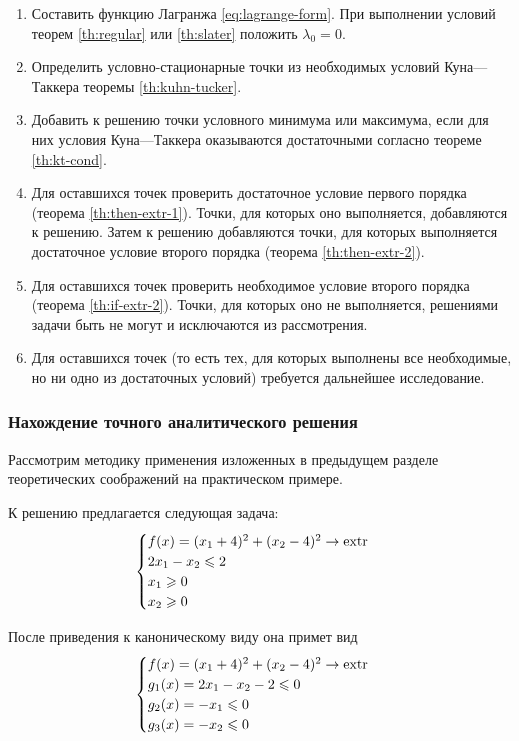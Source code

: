 \begin{enumerate}
  \renewcommand{\labelenumi}{\textbf{Шаг \arabic{enumi}.}}
\item Составить функцию Лагранжа \eqref{eq:lagrange-form}. При
  выполнении условий теорем \ref{th:regular} или \ref{th:slater}
  положить $\lambda_0 = 0$.
\item Определить условно-стационарные точки из необходимых условий
  Куна—Таккера теоремы \ref{th:kuhn-tucker}.
\item Добавить к решению точки условного минимума или максимума, если
  для них условия Куна—Таккера оказываются достаточными согласно
  теореме \ref{th:kt-cond}.
\item Для оставшихся точек проверить достаточное условие первого
  порядка (теорема \ref{th:then-extr-1}). Точки, для которых оно
  выполняется, добавляются к решению. Затем к решению добавляются
  точки, для которых выполняется достаточное условие второго порядка
  (теорема \ref{th:then-extr-2}).
\item Для оставшихся точек проверить необходимое условие второго
  порядка (теорема \ref{th:if-extr-2}). Точки, для которых оно не
  выполняется, решениями задачи быть не могут и исключаются из
  рассмотрения.
\item Для оставшихся точек (то есть тех, для которых выполнены все
  необходимые, но ни одно из достаточных условий) требуется дальнейшее
  исследование.
\end{enumerate}

\clearpage
\subsubsection{Нахождение точного аналитического решения}

Рассмотрим методику применения изложенных в предыдущем разделе
теоретических соображений на практическом примере.

К решению предлагается следующая задача:
\begin{equation}
  \label{eq:cond-optim-problem-raw}
  \begin{cases}
    f(x) = (x_1+4)^2 + (x_2-4)^2 \to \operatorname{extr} \\
    2x_1 - x_2 \leqslant 2 \\
    x_1 \geqslant 0 \\
    x_2 \geqslant 0
  \end{cases}
\end{equation}

После приведения к каноническому виду она примет вид
\begin{equation}
  \label{eq:cond-optim-problem}
  \begin{cases}
    f(x) = (x_1+4)^2 + (x_2-4)^2 \to \operatorname{extr} \\
    g_1(x) = 2x_1 - x_2 - 2 \leqslant 0 \\
    g_2(x) = -x_1 \leqslant 0 \\
    g_3(x) = -x_2 \leqslant 0
  \end{cases}
\end{equation}

